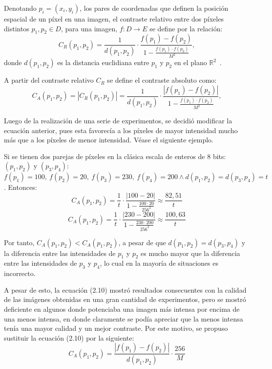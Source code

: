 Denotando $p_i =(x_i ,y_i )$, los pares de coordenadas que definen la posición espacial de un píxel en una imagen, el contraste relativo entre dos píxeles distintos $p_1, p_2 \in D$, para una imagen, $f : D \to E$ se define por la relación:
\begin{equation}
	C_R(p_1,p_2)=\frac{1}{d(p_1,p_2)}\cdot\frac{f(p_1)-f(p_2)}{1-\frac{f(p_1)\cdot f(p_2)}{M^2}},
\end{equation}
donde $d(p_1 ,p_2)$ es la distancia euclidiana entre $p_1$ y $p_2$ en el plano $\mathbb{R}^2$~\cite{patrascu2014mathematical}.

A partir del contraste relativo $C_R$ se define el contraste absoluto como:
\begin{equation}
	C_A(p_1,p_2)=|C_R(p_1,p_2)|=\frac{1}{d(p_1,p_2)}\cdot\frac{|f(p_1)-f(p_2)|}{1-\frac{f(p_1)\cdot f(p_2)}{M^2}},
\end{equation}

Luego de la realizaci\'on de una serie de experimentos, se decidi\'o modificar la ecuaci\'on anterior, pues esta favorec\'ia a los p\'ixeles de mayor intensidad mucho m\'as que a los p\'ixeles de menor intensidad. V\'ease el siguiente ejemplo.

Si se tienen dos parejas de p\'ixeles en la cl\'asica escala de enteros de 8 bits: $(p_1,p_2)$ y $(p_3,p_4)$: $f(p_1)=100,~f(p_2)=20,~f(p_3)=230,~f(p_4)=200 \land d(p_1,p_2)=d(p_3,p_4)=t$. Entonces:
\begin{equation}
	C_A(p_1,p_2)=\frac{1}{t}\cdot\frac{|100-20|}{1-\frac{100\cdot20}{256^2}}\approx\frac{82,51}{t}
\end{equation} 
\begin{equation}
	C_A(p_1,p_2)=\frac{1}{t}\cdot\frac{|230-200|}{1-\frac{230\cdot200}{256^2}}\approx\frac{100,63}{t}
\end{equation}

Por tanto, $C_A(p_1,p_2)<C_A(p_1,p_2)$, a pesar de que $d(p_1,p_2)=d(p_3,p_4)$ y la diferencia entre las intensidades de $p_1$ y $p_2$ es mucho mayor que la diferencia entre las intensidades de $p_3$ y $p_4$, lo cual en la mayor\'ia de situaciones es incorrecto.

A pesar de esto, la ecuaci\'on (2.10) mostr\'o resultados consecuentes con la calidad de las im\'agenes obtenidas en una gran cantidad de experimentos, pero se mostr\'o deficiente en algunos donde potenciaba una imagen m\'as intensa por encima de una menos intensa, en donde claramente se pod\'ia apreciar que la menos intensa ten\'ia una mayor calidad y un mejor contraste. Por este motivo, se propuso sustituir la ecuaci\'on (2.10) por la siguiente:
\begin{equation}
	C_A(p_1,p_2)=\frac{|f(p_1)-f(p_2)|}{d(p_1,p_2)}\cdot\frac{256}{M}
\end{equation}

